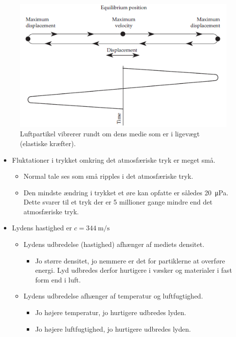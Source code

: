 \begin{figure} [H]
	\centering
	\includegraphics[width=0.85\linewidth]{graphics/1.png}
	\caption{Luftpartikel vibrerer rundt om dens medie som er i ligevægt (elastiske kræfter).}
	\label{fig:1}
\end{figure}

\begin{itemize}
	\item Fluktationer i trykket omkring det atmosfæriske tryk er meget små.
	\begin{itemize}
		\item Normal tale ses som små ripples i det atmosfæriske tryk.
		\item Den mindste ændring i trykket et øre kan opfatte er således \SI{20}{\micro\pascal}. Dette svarer til et tryk der er 5 millioner gange mindre end det atmosfæriske tryk.
	\end{itemize}
	\item Lydens hastighed er $c = \SI{344}{\meter/\second}$
	\begin{itemize}
		\item Lydens udbredelse (hastighed) afhænger af mediets densitet.
		\begin{itemize}
			\item Jo større densitet, jo nemmere er det for partiklerne at overføre energi. Lyd udbredes derfor hurtigere i væsker og materialer i fast form end i luft.
		\end{itemize}
		\item Lydens udbredelse afhænger af temperatur og luftfugtighed.
		\begin{itemize}
			\item Jo højere temperatur, jo hurtigere udbredes lyden. 
			\item Jo højere luftfugtighed, jo hurtigere udbredes lyden.
		\end{itemize} 
	\end{itemize}
\end{itemize}

